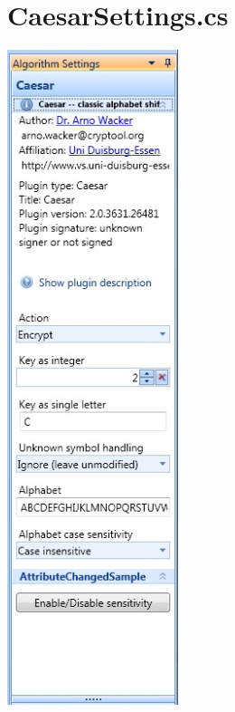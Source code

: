 \chapter{CaesarSettings.cs}
\label{app:CaesarSettings}

\begin{center}
		\includegraphics[width=5cm]{figures/task_pane.jpg}
\end{center}

